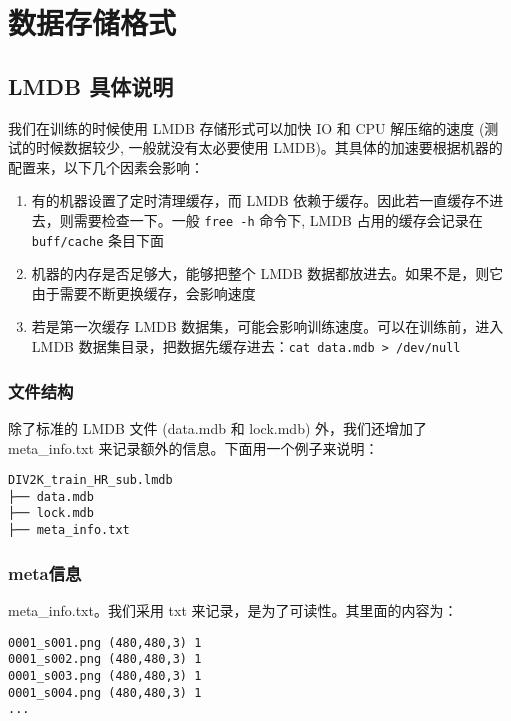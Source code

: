 \documentclass[../main.tex]{subfiles}
\begin{document}
\section{数据存储格式}\label{data_preparation:data_format}

\subsection{LMDB 具体说明}\label{data_preparation:lmdb}

我们在训练的时候使用 LMDB 存储形式可以加快 IO 和 CPU 解压缩的速度 (测试的时候数据较少, 一般就没有太必要使用 LMDB)。其具体的加速要根据机器的配置来，以下几个因素会影响：
\begin{enumerate}
    \item 有的机器设置了定时清理缓存，而 LMDB 依赖于缓存。因此若一直缓存不进去，则需要检查一下。一般 \texttt{free -h} 命令下, LMDB 占用的缓存会记录在 \texttt{buff/cache} 条目下面
    \item 机器的内存是否足够大，能够把整个 LMDB 数据都放进去。如果不是，则它由于需要不断更换缓存，会影响速度
    \item 若是第一次缓存 LMDB 数据集，可能会影响训练速度。可以在训练前，进入 LMDB 数据集目录，把数据先缓存进去：\texttt{cat data.mdb > /dev/null}
\end{enumerate}

\subsubsection{文件结构}

除了标准的 LMDB 文件 (data.mdb 和 lock.mdb) 外，我们还增加了 meta\_info.txt 来记录额外的信息。下面用一个例子来说明：

\begin{verbatim}
DIV2K_train_HR_sub.lmdb
├── data.mdb
├── lock.mdb
├── meta_info.txt
\end{verbatim}

\subsubsection{meta信息}

meta\_info.txt。我们采用 txt 来记录，是为了可读性。其里面的内容为：

\begin{verbatim}
0001_s001.png (480,480,3) 1
0001_s002.png (480,480,3) 1
0001_s003.png (480,480,3) 1
0001_s004.png (480,480,3) 1
...
\end{verbatim}
\end{document}
